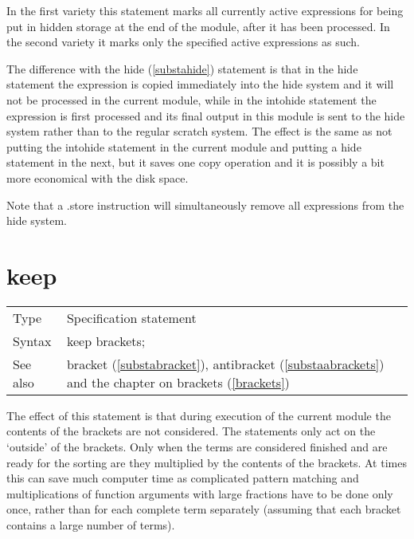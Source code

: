 \noindent In the first variety this statement marks all currently active 
expressions for being put in hidden storage at the end of the 
module, after it has been processed. In the second variety it marks only 
the specified active expressions as such. 
\vspace{4mm}

\noindent The difference with the hide (\ref{substahide}) statement is 
that in the hide statement the expression is copied immediately into the 
hide system and it will not be processed in the current module, while in 
the intohide statement the expression is first processed and its final 
output in this module is sent to the hide system rather than to the regular 
scratch system. The effect is the same as not putting the intohide 
statement in the current module and putting a hide statement in the next, 
but it saves one copy operation and it is possibly a bit more economical 
with the disk space.
\vspace{4mm}

\noindent Note that a .store instruction will simultaneously remove all 
expressions from the hide system. \vspace{10mm}

\section{keep}
\label{substakeep}

\noindent \begin{tabular}{ll}
Type & Specification statement\\
Syntax & keep brackets; \\
See also & bracket (\ref{substabracket}), antibracket 
     (\ref{substaabrackets}) and the chapter on brackets 
     (\ref{brackets})
\end{tabular} \vspace{4mm}

\noindent The effect 
of this statement is that during execution of the current module the 
contents of the brackets are not considered. The statements only act on the 
`outside' of the brackets. Only when the terms are considered finished and 
are ready for the sorting are they multiplied by the contents of the 
brackets. At times this can save much computer time as complicated pattern 
matching and multiplications of function arguments with large fractions 
have to be done only once, rather than for each complete term separately 
(assuming that each bracket contains a large number of terms).


